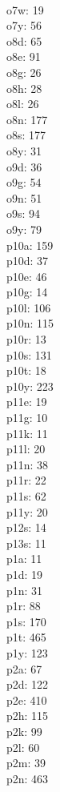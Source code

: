 \begin{multicols}{8}
  \\o7w: 19
  \\o7y: 56
  \\o8d: 65
  \\o8e: 91
  \\o8g: 26
  \\o8h: 28
  \\o8l: 26
  \\o8n: 177
  \\o8s: 177
  \\o8y: 31
  \\o9d: 36
  \\o9g: 54
  \\o9n: 51
  \\o9s: 94
  \\o9y: 79
  \\p10a: 159
  \\p10d: 37
  \\p10e: 46
  \\p10g: 14
  \\p10l: 106
  \\p10n: 115
  \\p10r: 13
  \\p10s: 131
  \\p10t: 18
  \\p10y: 223
  \\p11e: 19
  \\p11g: 10
  \\p11k: 11
  \\p11l: 20
  \\p11n: 38
  \\p11r: 22
  \\p11s: 62
  \\p11y: 20
  \\p12s: 14
  \\p13s: 11
  \\p1a: 11
  \\p1d: 19
  \\p1n: 31
  \\p1r: 88
  \\p1s: 170
  \\p1t: 465
  \\p1y: 123
  \\p2a: 67
  \\p2d: 122
  \\p2e: 410
  \\p2h: 115
  \\p2k: 99
  \\p2l: 60
  \\p2m: 39
  \\p2n: 463

\end{multicols}
